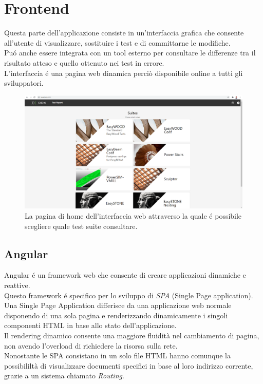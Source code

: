 \chapter{Frontend}
    Questa parte dell'applicazione consiste in un'interfaccia grafica che consente all'utente di visualizzare, sostituire i test e di committarne le modifiche.\\
    Pu\'o anche essere integrata con un tool esterno per consultare le differenze tra il risultato atteso e quello ottenuto nei test in errore.\\
    L'interfaccia \'e una pagina web dinamica perciò disponibile online a tutti gli sviluppatori.\\
    \begin{figure}[h]
        \includegraphics[width=\textwidth]{images/homepage.png}
        \caption{La pagina di home dell'interfaccia web attraverso la quale \'e possibile scegliere quale test suite consultare.}
    \end{figure}
    \section{Angular}
        Angular \cite{Angular} \'e un framework web che consente di creare applicazioni dinamiche e reattive.    \\
        Questo framework \'e specifico per lo sviluppo di \textit{SPA} (Single Page application).\\
        Una Single Page Application differisce da una applicazione web normale disponendo di una sola pagina e renderizzando dinamicamente i singoli componenti HTML in base allo stato dell'applicazione.\\
        Il rendering dinamico consente una maggiore fluidità nel cambiamento di pagina, non avendo l'overload di richiedere la risorsa sulla rete.\\
        Nonostante le SPA consistano in un solo file HTML hanno comunque la possibililtà di visualizzare documenti specifici in base al loro indirizzo corrente, grazie a un sistema chiamato \textit{Routing}. \\

